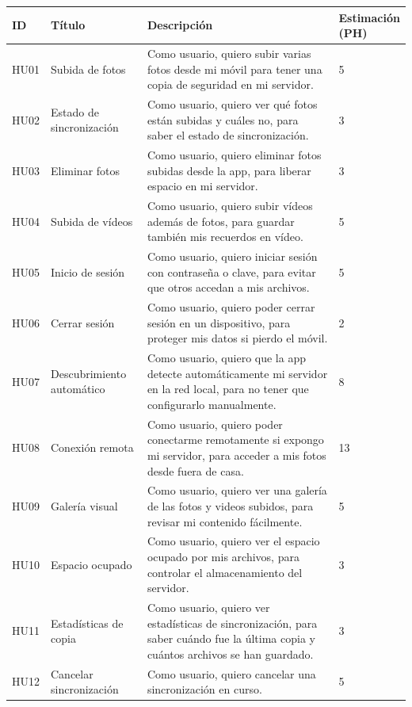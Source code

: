 \begin{tabularx}{\textwidth}{|l|l|>{\raggedright\arraybackslash}X|l|}
    \hline
\textbf{ID} & \textbf{Título} & \textbf{Descripción} & \makecell{\textbf{Estimación}\\\textbf{(PH)}} \\
    \hline
    HU01 & Subida de fotos & Como usuario, quiero subir varias fotos desde mi móvil para tener una copia de seguridad en mi servidor. & 5 \\
    \hline
    HU02 & Estado de sincronización & Como usuario, quiero ver qué fotos están subidas y cuáles no, para saber el estado de sincronización. & 3 \\
    \hline
    HU03 & Eliminar fotos & Como usuario, quiero eliminar fotos subidas desde la app, para liberar espacio en mi servidor. & 3 \\
    \hline
    HU04 & Subida de vídeos & Como usuario, quiero subir vídeos además de fotos, para guardar también mis recuerdos en vídeo. & 5 \\
    \hline
    HU05 & Inicio de sesión & Como usuario, quiero iniciar sesión con contraseña o clave, para evitar que otros accedan a mis archivos. & 5 \\
    \hline
    HU06 & Cerrar sesión & Como usuario, quiero poder cerrar sesión en un dispositivo, para proteger mis datos si pierdo el móvil. & 2 \\
    \hline
    HU07 & Descubrimiento automático & Como usuario, quiero que la app detecte automáticamente mi servidor en la red local, para no tener que configurarlo manualmente. & 8 \\
    \hline
    HU08 & Conexión remota & Como usuario, quiero poder conectarme remotamente si expongo mi servidor, para acceder a mis fotos desde fuera de casa. & 13 \\
    \hline
    HU09 & Galería visual & Como usuario, quiero ver una galería de las fotos y videos subidos, para revisar mi contenido fácilmente. & 5 \\
    \hline
    HU10 & Espacio ocupado & Como usuario, quiero ver el espacio ocupado por mis archivos, para controlar el almacenamiento del servidor. & 3 \\
    \hline
    HU11 & Estadísticas de copia & Como usuario, quiero ver estadísticas de sincronización, para saber cuándo fue la última copia y cuántos archivos se han guardado. & 3 \\
    \hline
    HU12 & Cancelar sincronización & Como usuario, quiero cancelar una sincronización en curso. & 5 \\

\end{tabularx}
